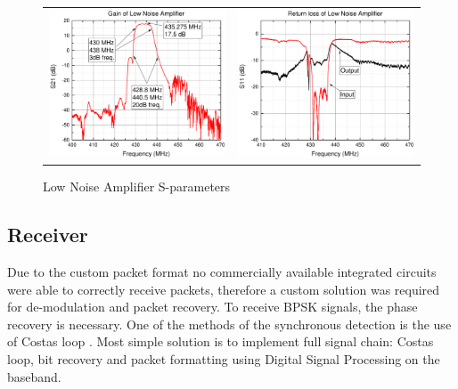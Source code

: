 \begin{figure}
   \centering
\begin{tabular}{cc}
        \includegraphics[width=0.35\paperwidth]{img/5/LnaGain.pdf}
    & 
        \includegraphics[width=0.35\paperwidth]{img/5/LnaMatch.pdf}
\end{tabular}
\label{lna_s_params}
\caption{Low Noise Amplifier S-parameters}
\end{figure}


\subsection{Receiver}
Due to the custom packet format no commercially available integrated circuits were able to correctly receive packets, therefore a custom solution was required for de-modulation and packet recovery.
To receive BPSK signals, the phase recovery is necessary. One of the methods of the synchronous detection is the use of Costas loop \cite{costas_loop}. Most simple solution is to implement full signal chain: Costas loop, bit recovery and packet formatting using Digital Signal Processing on the baseband.


